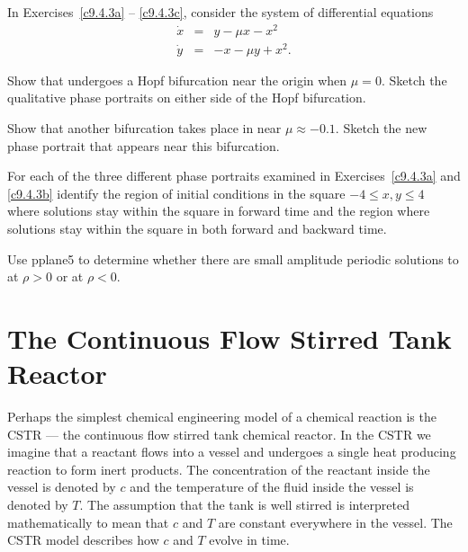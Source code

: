 \noindent In Exercises~\ref{c9.4.3a} -- \ref{c9.4.3c}, 
consider the system of differential equations 
\begin{equation*}  \label{E:duff}
\begin{array}{rcl}
\dot{x} & = & y - \mu x - x^2   \\
\dot{y} & = & -x - \mu y + x^2.
\end{array}
\end{equation*}
\begin{exercise} \label{c9.4.3a}
Show that  undergoes a Hopf bifurcation near the origin when 
$\mu=0$.  Sketch the qualitative phase portraits on either 
side of the Hopf bifurcation.
\end{exercise}
\begin{exercise} \label{c9.4.3b}
Show that another bifurcation takes place in  near 
$\mu\approx -0.1$.  Sketch the new phase portrait that appears near this 
bifurcation.    
\end{exercise}
\begin{exercise} \label{c9.4.3c}
For each of the three different phase portraits examined in 
Exercises~\ref{c9.4.3a} and \ref{c9.4.3b} identify the region of initial 
conditions in the square $-4\leq x,y \leq 4$ where solutions stay within the 
square in forward time and the region where solutions stay within the square 
in both forward and backward time.
\end{exercise}

\begin{exercise} \label{c9.4.4}
Use {\sf pplane5} to determine whether there are small amplitude periodic 
solutions to  at $\rho>0$ or at $\rho<0$.
\end{exercise}



\section{The Continuous Flow Stirred Tank Reactor} 
\label{S:CSTR} 

Perhaps the simplest chemical engineering model of a chemical
reaction is the CSTR --- the continuous flow stirred tank
chemical reactor.  In the CSTR we imagine that a reactant flows
into a vessel and undergoes a single heat producing reaction to
form inert products.  The concentration of the reactant inside
the vessel is denoted by $c$ and the temperature of the fluid
inside the vessel is denoted by $T$.  The assumption that the
tank is well stirred is interpreted mathematically to mean that
$c$ and $T$ are constant everywhere in the vessel.  The CSTR
model describes how $c$ and $T$ evolve in time. 

